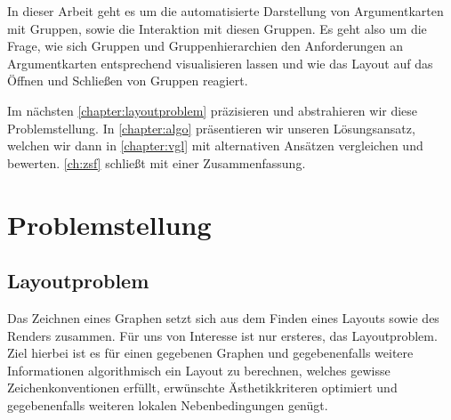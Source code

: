 In dieser Arbeit geht es um die automatisierte Darstellung von Argumentkarten mit Gruppen, sowie die Interaktion mit diesen Gruppen. 
Es geht also um die Frage, wie sich Gruppen und Gruppenhierarchien den Anforderungen an Argumentkarten entsprechend visualisieren lassen 
und wie das Layout auf das Öffnen und Schließen von Gruppen reagiert.

Im nächsten \autoref{chapter:layoutproblem}  präzisieren und abstrahieren wir diese Problemstellung. 
In \autoref{chapter:algo} präsentieren wir unseren Lösungsansatz, welchen wir dann in \autoref{chapter:vgl} mit alternativen Ansätzen vergleichen und bewerten.
\autoref{ch:zsf} schließt mit einer Zusammenfassung.



\chapter{Problemstellung}%
\label{chapter:layoutproblem}

\section{Layoutproblem}
\label{sec:layoutproblem}
Das Zeichnen eines Graphen setzt sich aus dem Finden eines Layouts sowie des Renders zusammen. 
Für uns von Interesse ist nur ersteres, das Layoutproblem. 
Ziel hierbei ist es für einen gegebenen Graphen und gegebenenfalls weitere Informationen algorithmisch ein Layout zu berechnen,
welches gewisse Zeichenkonventionen erfüllt, erwünschte Ästhetikkriteren optimiert und gegebenenfalls weiteren lokalen Nebenbedingungen genügt.



